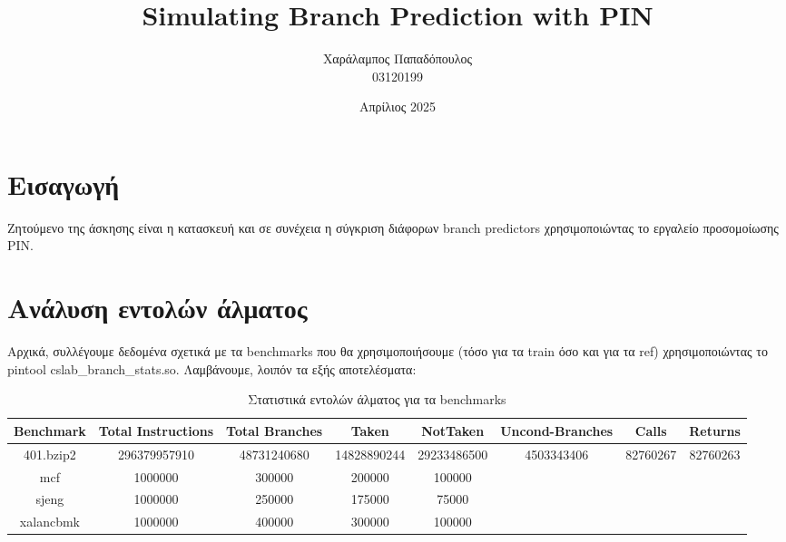 \documentclass{article}
\title{Simulating Branch Prediction with PIN}
\author{Χαράλαμπος Παπαδόπουλος \\03120199}
\date{Απρίλιος 2025}
\begin{document}
\maketitle

\section{Εισαγωγή}

Ζητούμενο της άσκησης είναι η κατασκευή και σε συνέχεια η σύγκριση διάφορων branch predictors χρησιμοποιώντας το εργαλείο προσομοίωσης PIN.

\section{Ανάλυση εντολών άλματος}
Αρχικά, συλλέγουμε δεδομένα σχετικά με τα benchmarks που θα χρησιμοποιήσουμε (τόσο για τα train όσο και για τα ref) χρησιμοποιώντας το pintool cslab\_branch\_stats.so. Λαμβάνουμε, λοιπόν τα εξής αποτελέσματα:

\begin{table}[h!]
    \centering
    \begin{tabular}{|c|c|c|c|c|c|c|c|}
        \hline
        Benchmark & Total Instructions & Total Branches & Taken & NotTaken & Uncond-Branches & Calls & Returns \\
        \hline
        401.bzip2 & 296379957910 & 48731240680 & 14828890244 & 29233486500 & 4503343406 & 82760267 & 82760263 \\
        \hline
        mcf & 1000000 & 300000 & 200000 & 100000 \\
        sjeng & 1000000 & 250000 & 175000 & 75000 \\
        xalancbmk & 1000000 & 400000 & 300000 & 100000 \\
        \hline
    \end{tabular}
    \caption{Στατιστικά εντολών άλματος για τα benchmarks}
\end{table}
\end{document}
